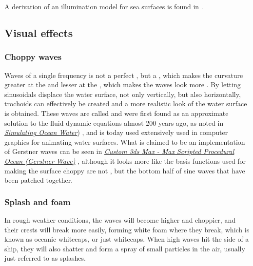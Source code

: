 A derivation of an illumination model for sea surfaces is found in .

\subsection{Visual effects}

\subsubsection{Choppy waves}

Waves of a single frequency is not a perfect \sinusoidal, but a \trochoid, which makes the curvature greater at the  and lesser at the , which makes the waves look more . By letting sinusoidals displace the water surface, not only vertically, but also horizontally, trochoids can effectively be created and a more realistic look of the water surface is obtained. These waves are called  and were first found as an approximate solution to the fluid dynamic equations almost 200 years ago, as noted in \textit{\href{http://graphics.ucsd.edu/courses/rendering/2005/jdewall/tessendorf.pdf}{Simulating Ocean Water}}) \citep{temp}, and is today used extensively used in computer graphics for animating water surfaces. What is claimed to be an implementation of Gerstner waves can be seen in \textit{\href{http://www.youtube.com/watch?v=3_z851QRAl8}{Custom 3ds Max - Max Scripted Procedural Ocean (Gerstner Wave)}} \citep{temp}, although it looks more like the basis functions used for making the surface choppy are not \trochoids, but the bottom half of sine waves that have been patched together.

\subsubsection{Splash and foam}

In rough weather conditions, the waves will become higher and choppier, and their crests will break more easily, forming white foam where they break, which is known as oceanic whitecaps, or just whitecaps. When high waves hit the side of a ship, they will also shatter and form a spray of small particles in the air, usually just referred to as splashes.

